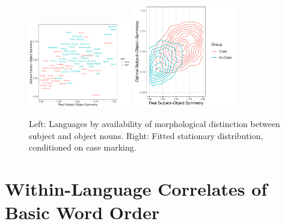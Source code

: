 \documentclass[11pt,a4paper]{article}
\begin{document}
\begin{figure}
    \centering
    \includegraphics[width=0.4\textwidth]{../analysis/figures/by_patient_marking.pdf}
    \includegraphics[width=0.4\textwidth]{../change/visualize/stationary_case.pdf}
    \caption{Left: Languages by availability of morphological distinction between subject and object nouns. Right: Fitted stationary distribution, conditioned on case marking.}
    \label{fig:langs-case}
\end{figure}






\section{Within-Language Correlates of Basic Word Order}
\end{document}
